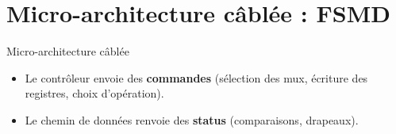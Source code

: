 \section{Micro-architecture c\^abl\'ee : FSMD}

\begin{frame}{Micro-architecture c\^abl\'ee}
  \centering

  \vspace{2mm}
  \begin{itemize}
    \item Le contr\^oleur envoie des \textbf{commandes} (s\'election des mux, \'ecriture des registres, choix d'op\'eration).
    \item Le chemin de donn\'ees renvoie des \textbf{status} (comparaisons, drapeaux).
  \end{itemize}
\end{frame}

